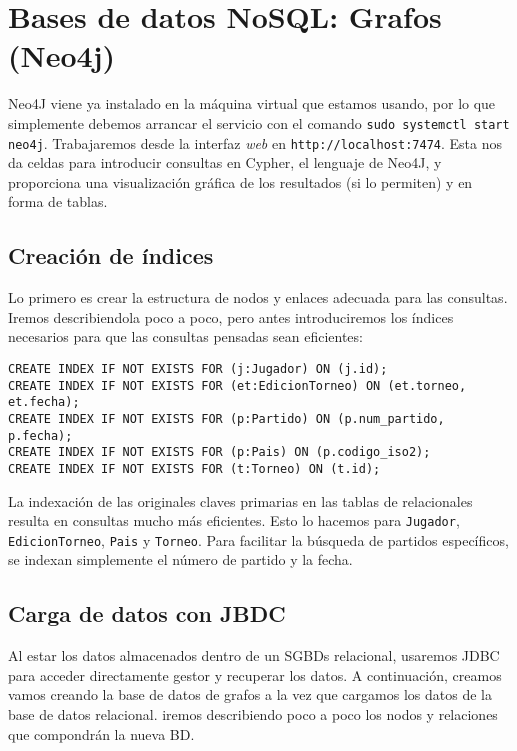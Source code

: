 \section{Bases de datos NoSQL: Grafos (Neo4j)}

Neo4J viene ya instalado en la máquina virtual que estamos usando, por lo que simplemente debemos arrancar el servicio con el comando \texttt{sudo systemctl start neo4j}. Trabajaremos desde la interfaz \textit{web} en \texttt{http://localhost:7474}. Esta nos da celdas para introducir consultas en Cypher, el lenguaje de Neo4J, y proporciona una visualización gráfica de los resultados (si lo permiten) y en forma de tablas. \\

\subsection{Creación de índices}

Lo primero es crear la estructura de nodos y enlaces adecuada para las consultas. Iremos describiendola poco a poco, pero antes introduciremos los índices necesarios para que las consultas pensadas sean eficientes:

\begin{verbatim}
CREATE INDEX IF NOT EXISTS FOR (j:Jugador) ON (j.id);
CREATE INDEX IF NOT EXISTS FOR (et:EdicionTorneo) ON (et.torneo, et.fecha);
CREATE INDEX IF NOT EXISTS FOR (p:Partido) ON (p.num_partido, p.fecha);
CREATE INDEX IF NOT EXISTS FOR (p:Pais) ON (p.codigo_iso2);
CREATE INDEX IF NOT EXISTS FOR (t:Torneo) ON (t.id);
\end{verbatim}

La indexación de las originales claves primarias en las tablas de relacionales resulta en consultas mucho más eficientes. Esto lo hacemos para \texttt{Jugador}, \texttt{EdicionTorneo}, \texttt{Pais} y \texttt{Torneo}. Para facilitar la búsqueda de partidos específicos, se indexan simplemente el número de partido y la fecha.

\subsection{Carga de datos con JBDC}

Al estar los datos almacenados dentro de un SGBDs relacional, usaremos JDBC para acceder directamente gestor y recuperar los datos. A continuación, creamos vamos creando la base de datos de grafos a la vez que cargamos los datos de la base de datos relacional. iremos describiendo poco a poco los nodos y relaciones que compondrán la nueva BD. \\

